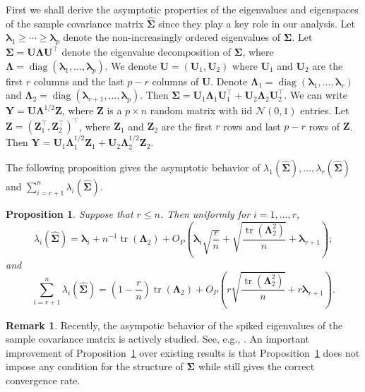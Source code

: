 \documentclass[12pt]{article} %
\DeclareMathOperator{\mytr}{tr}
\DeclareMathOperator{\mydiag}{diag}
\newcommand{\bZ}{\mathbf{Z}}
\newcommand{\bY}{\mathbf{Y}}
\newcommand{\bU}{\mathbf{U}}
\newcommand{\bfsym}[1]{\ensuremath{\boldsymbol{#1}}}
\def\blambda {\bfsym {\lambda}}
\def\bLambda {\bfsym {\Lambda}}
\def\bSigma {\bfsym {\Sigma}}
\newtheorem{proposition}{Proposition}
\theoremstyle{definition}
\newtheorem{remark}{Remark}
\begin{document}
First we shall derive the asymptotic properties of the eigenvalues and eigenspaces of the sample covariance matrix $\hat{\bSigma}$ since they play a key role in our analysis.
Let $\blambda_1\geq\cdots \geq \blambda_p$ denote the non-increasingly ordered eigenvalues of $\bSigma$.
Let $\bSigma= \bU\bLambda \bU^\top$ denote the eigenvalue decomposition of $\bSigma$, where $\bLambda =\mydiag (\blambda_1,\ldots,\blambda_p)$.
We denote $\bU=(\bU_1,\bU_2)$ where $\bU_1$ and $\bU_2$ are the first $r$ columns and the last $p-r$ columns of $\bU$.
Denote $\bLambda_1=\mydiag(\blambda_1,\ldots,\blambda_r)$ and $\bLambda_2=\mydiag(\blambda_{r+1},\ldots,\blambda_p)$.
Then $\bSigma=\bU_1\bLambda_1 \bU_1^\top+\bU_2\bLambda_2 \bU_2^\top$.
We can write $\bY=\bU\bLambda^{1/2}\bZ$, where $\bZ$ is a $p\times n$ random matrix with iid $\mathcal{N}(0,1)$ entries.
    Let $\bZ =(\bZ_1^\top,\bZ_2^\top)^\top$, where $\bZ_1$ and $\bZ_2$ are the first $r$ rows and last $p-r$ rows of $\bZ$.
    Then $\bY=\bU_1 \bLambda_1^{1/2} \bZ_1 +\bU_2 \bLambda_2^{1/2} \bZ_2$.





    The following proposition gives the asymptotic behavior of $\lambda_1(\hat{\bSigma}),\ldots, \lambda_r(\hat{\bSigma})$ and $\sum_{i=r+1}^n\lambda_i(\hat{\bSigma})$.
\begin{proposition}
    \label{eigenvalueProp}
    Suppose that $r\leq n$.
    Then uniformly for $i=1,\ldots, r$, 
\begin{equation*}
    \lambda_i(\hat{\bSigma})
        =
        \blambda_i
        +
        n^{-1}\mytr(\bLambda_2)
        +O_P\left(\blambda_i \sqrt{\frac{r}{n}}+\sqrt{\frac{\mytr(\bLambda_2^2)}{ n}}+\blambda_{r+1}\right);
    \end{equation*}
        and
\begin{equation*}
     \sum_{i=r+1}^n\lambda_i(\hat{\bSigma})
    =
    \left(1-\frac{r}{n}\right)\mytr(\bLambda_2)
    +O_P\left(r\sqrt{\frac{\mytr(\bLambda_2^2)}{ n}}+r\blambda_{r+1}\right)
    .
\end{equation*}
\end{proposition}

\begin{remark}
    Recently, the asympotic behavior of the spiked eigenvalues of the sample covariance matrix is actively studied.
    See, e.g., \cite{Yata2013PCA,Shen2016A,wang2017As,Cai2017Limiting}.
    An important improvement of Proposition~\ref{eigenvalueProp} over existing results is that Proposition~\ref{eigenvalueProp} does not impose any condition for the structure of $\bSigma$ while still gives the correct convergence rate.
\end{remark}
\end{document}
